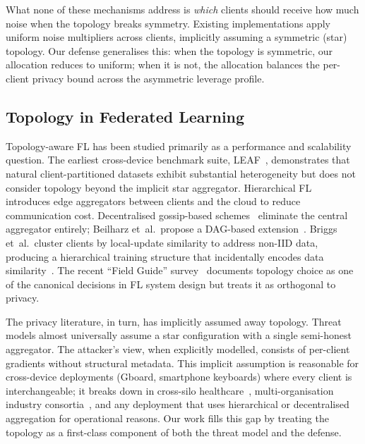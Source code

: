 What none of these mechanisms address is \emph{which} clients should
receive how much noise when the topology breaks symmetry. Existing
implementations apply uniform noise multipliers across clients, implicitly
assuming a symmetric (\eg star) topology. Our defense generalises this:
when the topology is symmetric, our allocation reduces to uniform; when
it is not, the allocation balances the per-client privacy bound across
the asymmetric leverage profile.

\subsection{Topology in Federated Learning}
\label{sec:related-topology}

Topology-aware FL has been studied primarily as a performance and
scalability question. The earliest cross-device benchmark suite, LEAF~\cite{leaf2018},
demonstrates that natural client-partitioned datasets exhibit substantial
heterogeneity but does not consider topology beyond the implicit
star aggregator. Hierarchical FL~\cite{liu2020hierarchical,abad2020icassp}
introduces edge aggregators between clients and the cloud to reduce
communication cost. Decentralised gossip-based
schemes~\cite{roy2019braintorrent,hegedus2021decentralized} eliminate
the central aggregator entirely; Beilharz et~al.\ propose a DAG-based
extension~\cite{beilharz2021dag}. Briggs et~al.\ cluster clients by
local-update similarity to address non-IID data, producing a hierarchical
training structure that incidentally encodes data
similarity~\cite{briggs2020hierarchical}. The recent ``Field Guide''
survey~\cite{wang2021fieldguide} documents topology choice as one of the
canonical decisions in FL system design but treats it as orthogonal to
privacy.

The privacy literature, in turn, has implicitly assumed away topology.
Threat models almost universally assume a star configuration with a
single semi-honest aggregator. The attacker's view, when explicitly
modelled, consists of per-client gradients without structural metadata.
This implicit assumption is reasonable for cross-device deployments
(Gboard, smartphone keyboards) where every client is interchangeable;
it breaks down in cross-silo healthcare~\cite{flamby2022,sheller2020medicine,dayan2021covid},
multi-organisation industry consortia~\cite{melloddy2024}, and any
deployment that uses hierarchical or decentralised aggregation for
operational reasons. Our work fills this gap by treating the topology
as a first-class component of both the threat model and the defense.

